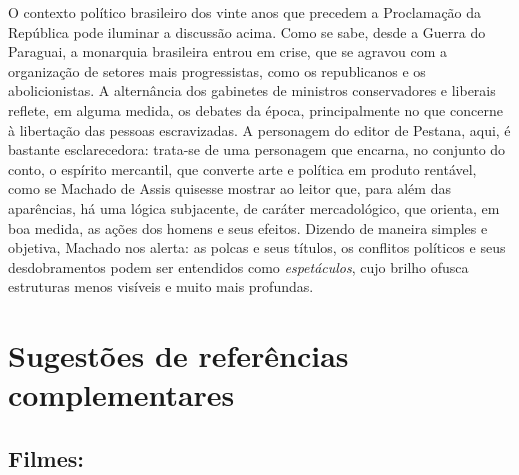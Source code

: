 \documentclass[11pt]{extarticle}
\begin{document}
O contexto político brasileiro dos vinte anos que precedem a Proclamação
da República pode iluminar a discussão acima. Como se sabe, desde a
Guerra do Paraguai, a monarquia brasileira entrou em crise, que se
agravou com a organização de setores mais progressistas, como os
republicanos e os abolicionistas. A alternância dos gabinetes de
ministros conservadores e liberais reflete, em alguma medida, os debates
da época, principalmente no que concerne à libertação das pessoas
escravizadas. A personagem do editor de Pestana, aqui, é bastante
esclarecedora: trata-se de uma personagem que encarna, no conjunto do
conto, o espírito mercantil, que converte arte e política em produto
rentável, como se Machado de Assis quisesse mostrar ao leitor que, para
além das aparências, há uma lógica subjacente, de caráter mercadológico,
que orienta, em boa medida, as ações dos homens e seus efeitos. Dizendo
de maneira simples e objetiva, Machado nos alerta: as polcas e seus
títulos, os conflitos políticos e seus desdobramentos podem ser
entendidos como \emph{espetáculos}, cujo brilho ofusca estruturas menos
visíveis e muito mais profundas.


\section{Sugestões de referências complementares}\label{sugestoes}

\subsection{Filmes:}
\end{document}
